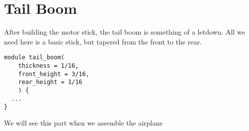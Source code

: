 \section{Tail Boom}

After building the motor stick, the tail boom is something of a letdown. All we
need here is a basic stick, but tapered from the front to the rear.

\begin{lstlisting}
module tail_boom(
	thickness = 1/16,
	front_height = 3/16,
	rear_height = 1/16
	) {
  ...
}
\end{lstlisting}

We will see this part when we assemble the airplane
